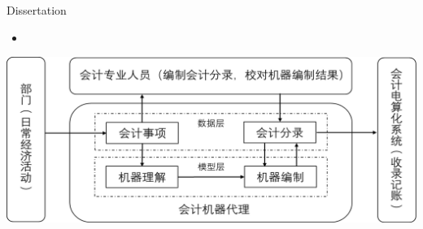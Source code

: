 \begin{xframe}{Dissertation}
    \begin{itemize}
        \item {}
    \end{itemize}

    \vspace{1.0mm}

    \includegraphics[width=\textwidth]{./style/images/accounting.png}
\end{xframe}

